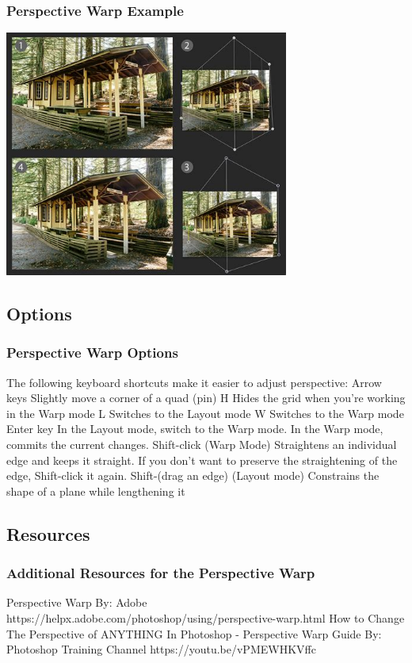 \documentclass{beamer}
\begin{document}
\begin{frame}
	\frametitle{Perspective Warp Example}
	\begin{center}
		\includegraphics[width=0.7\textwidth]{images/Perspective Warp example.jpg}
	\end{center}
\end{frame}

\subsection{Options}		
\begin{frame}
	\frametitle{Perspective Warp Options}
	\begin{outline}
		\1 The following keyboard shortcuts make it easier to adjust perspective:
		\2 Arrow keys
		\3 Slightly move a corner of a quad (pin)
		\2 H
		\3 Hides the grid when you're working in the Warp mode
		\2 L
		\3 Switches to the Layout mode
		\2 W
		\3 Switches to the Warp mode
		\2 Enter key
		\3 In the Layout mode, switch to the Warp mode. 
		\3 In the Warp mode, commits the current changes.
		\2 Shift-click
		\3 (Warp Mode) Straightens an individual edge and keeps it straight. 
		\3 If you don't want to preserve the straightening of the edge, Shift-click it again.
		\2 Shift-(drag an edge)
		\3 (Layout mode) Constrains the shape of a plane while lengthening it
	\end{outline}
\end{frame}

\subsection{Resources}		
\begin{frame}
	\frametitle{Additional Resources for the Perspective Warp}
	\begin{outline}
		\1 Perspective Warp
		\2  By:  Adobe
		\2 https://helpx.adobe.com/photoshop/using/perspective-warp.html
		\1 How to Change The Perspective of ANYTHING In Photoshop - Perspective Warp Guide
		\2  By:  Photoshop Training Channel
		\2 https://youtu.be/vPMEWHKVffc
	\end{outline}
\end{frame}
\end{document}
